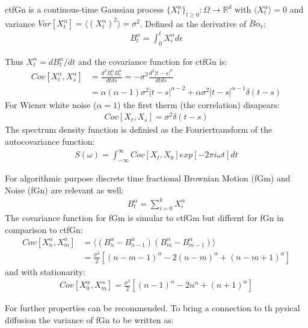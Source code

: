 \documentclass[
  a4paper,BCOR10mm,oneside,
  bibtotoc,idxtotoc,
  headsepline,footsepline,%
  fleqn,openbib
]{scrbook}
\begin{document}
\begin{mydef}
ctfGn is a continous-time Gaussian process $\{X^{\alpha}_t\}_{t\geq0}: \Omega \rightarrow \mathbb{R}^d$ with $\langle X^{\alpha}_t \rangle=0$ and variance $Var[X^{\alpha}_t]= \langle (X^{\alpha}_t)^2 \rangle=\sigma^2$. Defined as the derivative of $B{\alpha}_t$:
\begin{align}
  B^{\alpha}_t=\int^t_0 X^{\alpha}_{\epsilon} d \epsilon
\end{align}
\end{mydef}
Thus $X^{\alpha}_t=d B^{\alpha}_t/dt$ and the covariance function for ctfGn is:
\begin{align}
 Cov[X^{\alpha}_t,X^{\alpha}_s]&= \frac{d^2 B^{\alpha}_t B^{\alpha}_s}{dt ds}=-\sigma^2 \frac{d^2 |t-s|^{\alpha}}{dtds}\\
 &=\alpha (\alpha-1) \sigma^2 |t-s|^{\alpha-2}+\alpha \sigma^2 |t-s|^{\alpha-1} \delta(t-s)
\end{align}
For Wiener white noise ($\alpha=1$) the first therm (the correlation) disapears:
\begin{align}
 Cov[X_t,X_s]= \sigma^2 \delta(t-s)
\end{align}
The spectrum density function is definied as the Fouriertransform of the autocovariance function:
\begin{align}
 S(\omega)= \int^{\infty}_{-\infty} Cov[X_t,X_0] exp[-2 \pi i \omega t] dt
\end{align}



For algorithmic purpose discrete time fractional Brownian Motion  (fGm) and Noise (fGn) are relevant as well:
\begin{align}
B^{\alpha}_{t}= \sum_{i=0}^kX^{\alpha}_i
\end{align}
The covariance function for fGm is simular to ctfGm but differnt for fGn in comparison to ctfGn:
\begin{align*}
 Cov[X^{\alpha}_n,X^{\alpha}_m]&=\langle (B^{\alpha}_n-B^{\alpha}_{n-1}) (B^{\alpha}_m-B^{\alpha}_{m-1})\rangle \\ &=\frac{\sigma^2}{2}[(n-m-1)^{\alpha}-2(n-m)^{\alpha}+(n-m+1)^{\alpha}]
\end{align*}
and with stationarity:
\begin{align}
 Cov[X^{\alpha}_0,X^{\alpha}_m]=\frac{\sigma^2}{2}[(n-1)^{\alpha}-2n^{\alpha}+(n+1)^{\alpha}]
\end{align}

For further properties \cite{qian2003fractional} can be recommended.
To bring a connection to th pysical diffusion the variance of fGn to be written as: 
\end{document}
